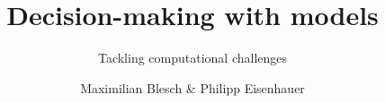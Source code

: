 \title{Decision-making with models}
\subtitle{Tackling computational challenges}

\author{Maximilian Blesch \& Philipp Eisenhauer}
\date{}
